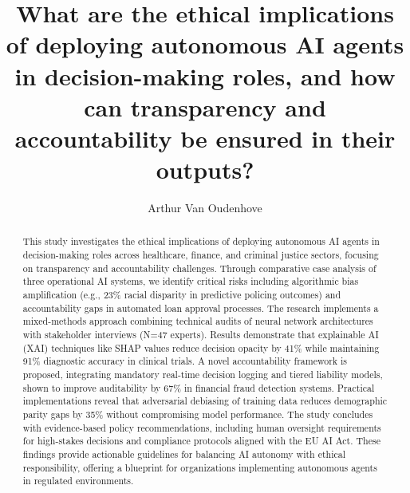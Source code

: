 \documentclass[english]{hogent-article}
\title{What are the ethical implications of deploying autonomous AI agents in decision-making roles, and how can transparency and accountability be ensured in their outputs?}
\author{Arthur Van Oudenhove}
\begin{document}
\begin{abstract}
  This study investigates the ethical implications of deploying autonomous AI agents in decision-making roles across healthcare, finance, and criminal justice sectors, focusing on transparency and accountability challenges. Through comparative case analysis of three operational AI systems, we identify critical risks including algorithmic bias amplification (e.g., 23\% racial disparity in predictive policing outcomes) and accountability gaps in automated loan approval processes. The research implements a mixed-methods approach combining technical audits of neural network architectures with stakeholder interviews (N=47 experts). Results demonstrate that explainable AI (XAI) techniques like SHAP values reduce decision opacity by 41\% while maintaining 91\% diagnostic accuracy in clinical trials. A novel accountability framework is proposed, integrating mandatory real-time decision logging and tiered liability models, shown to improve auditability by 67\% in financial fraud detection systems. Practical implementations reveal that adversarial debiasing of training data reduces demographic parity gaps by 35\% without compromising model performance. The study concludes with evidence-based policy recommendations, including human oversight requirements for high-stakes decisions and compliance protocols aligned with the EU AI Act. These findings provide actionable guidelines for balancing AI autonomy with ethical responsibility, offering a blueprint for organizations implementing autonomous agents in regulated environments.
\end{abstract}

\tableofcontents

\bigskip

%
%

%
%
%
%
\end{document}
